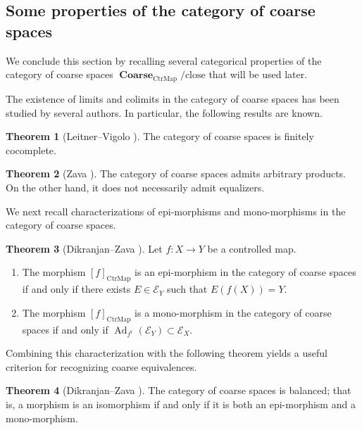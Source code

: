 \documentclass[12pt, a4paper]{amsart}
\theoremstyle{definition}
\newtheorem{theorem}{Theorem}[section]
\newcommand{\Ad}{\mathop{\mathrm{Ad}}\nolimits}
\newcommand{\Coarse}{\mathop{\mathbf{Coarse}}\nolimits}
\newcommand{\CtrMap}{\mathrm{CtrMap}}
\newcommand{\close}{\mathrm{close}}
\begin{document}
\subsection{Some properties of the category of coarse spaces}

We conclude this section by recalling several categorical properties of the
category of coarse spaces $\Coarse_{\CtrMap}/\close$ that will be used later.

The existence of limits and colimits in the category of coarse spaces has
been studied by several authors. In particular, the following results are
known.

\begin{theorem}[Leitner--Vigolo \cite{LeitnerVigolo2023}]\label{theorem:Coarsecocomp}
The category of coarse spaces is finitely cocomplete.
\end{theorem}

\begin{theorem}[Zava \cite{Zava2019CoarseCat}]
The category of coarse spaces admits arbitrary products.
On the other hand, it does not necessarily admit equalizers.
\end{theorem}

We next recall characterizations of epi-morphisms and mono-morphisms in the
category of coarse spaces.

\begin{theorem}[Dikranjan--Zava {\cite{DikranjanZava2017}}]\label{theorem:CtrMap_epimono}
Let $f:X\rightarrow Y$ be a controlled map.
\begin{enumerate}
\item
The morphism $[f]_{\CtrMap}$ is an epi-morphism in the category of coarse
spaces if and only if there exists $E\in\mathcal{E}_Y$ such that
$E(f(X))=Y$.

\item
The morphism $[f]_{\CtrMap}$ is a mono-morphism in the category of coarse
spaces if and only if
$\Ad_{f^\dagger}(\mathcal{E}_Y)\subset\mathcal{E}_X$.
\end{enumerate}
\end{theorem}

Combining this characterization with the following theorem yields a useful
criterion for recognizing coarse equivalences.

\begin{theorem}[Dikranjan--Zava {\cite{DikranjanZava2017}}]\label{theorem:coarse_balanced}
The category of coarse spaces is balanced; that is, a morphism is an
isomorphism if and only if it is both an epi-morphism and a mono-morphism.
\end{theorem}
\end{document}
